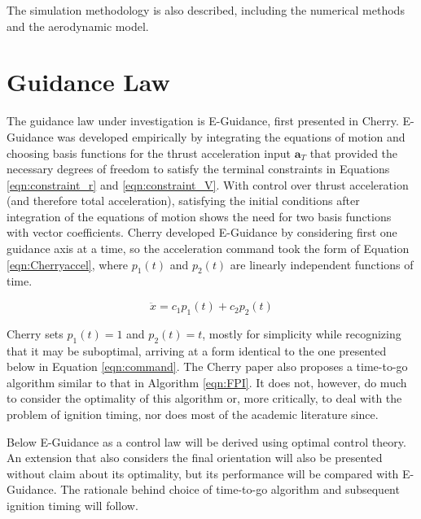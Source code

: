The simulation methodology is also described, including the numerical methods and the aerodynamic model.




\section{Guidance Law} \label{sec:guidancelaw}
The guidance law under investigation is E-Guidance, first presented in Cherry\:\cite{CHERRY}. E-Guidance was developed empirically by integrating the equations of motion and choosing basis functions for the thrust acceleration input $\boldsymbol{a}_T$ that provided the necessary degrees of freedom to satisfy the terminal constraints in Equations \ref{eqn:constraint_r} and \ref{eqn:constraint_V}. With control over thrust acceleration (and therefore total acceleration), satisfying the initial conditions after integration of the equations of motion shows the need for two basis functions with vector coefficients. Cherry developed E-Guidance by considering first one guidance axis at a time, so the acceleration command took the form of Equation \ref{eqn:Cherryaccel}, where $p_1(t)$ and $p_2(t)$ are linearly independent functions of time.

\begin{equation}
\label{eqn:Cherryaccel}
\ddot{x} = c_1p_1(t) + c_2p_2(t)
\end{equation}

Cherry sets $p_1(t) = 1$ and $p_2(t) = t$, mostly for simplicity while recognizing that it may be suboptimal, arriving at a form identical to the one presented below in Equation \ref{eqn:command}. 
The Cherry paper also proposes a time-to-go algorithm similar to that in Algorithm \ref{eqn:FPI}. It does not, however, do much to consider the optimality of this algorithm or, more critically, to deal with the problem of ignition timing, nor does most of the academic literature since. 

Below E-Guidance as a control law will be derived using optimal control theory. An extension that also considers the final orientation will also be presented without claim about its optimality, but its performance will be compared with E-Guidance. The rationale behind choice of time-to-go algorithm and subsequent ignition timing will follow.

